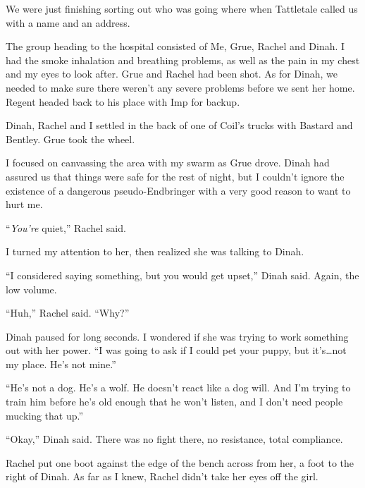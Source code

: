\blacksquare



We were just finishing sorting out who was going where when Tattletale called us with a name and an address.



The group heading to the hospital consisted of Me, Grue, Rachel and Dinah.  I had the smoke inhalation and breathing problems, as well as the pain in my chest and my eyes to look after.  Grue and Rachel had been shot.  As for Dinah, we needed to make sure there weren't any severe problems before we sent her home.  Regent headed back to his place with Imp for backup.



Dinah, Rachel and I settled in the back of one of Coil's trucks with Bastard and Bentley.  Grue took the wheel.



I focused on canvassing the area with my swarm as Grue drove.  Dinah had assured us that things were safe for the rest of night, but I couldn't ignore the existence of a dangerous pseudo-Endbringer with a very good reason to want to hurt me.



``\emph{You're} quiet,'' Rachel said.



I turned my attention to her, then realized she was talking to Dinah.



``I considered saying something, but you would get upset,'' Dinah said.  Again, the low volume.



``Huh,'' Rachel said.  ``Why?''



Dinah paused for long seconds.  I wondered if she was trying to work something out with her power.  ``I was going to ask if I could pet your puppy, but it's\ldots not my place.  He's not mine.''



``He's not a dog.  He's a wolf.  He doesn't react like a dog will.  And I'm trying to train him before he's old enough that he won't listen, and I don't need people mucking that up.''



``Okay,'' Dinah said.  There was no fight there, no resistance, total compliance.



Rachel put one boot against the edge of the bench across from her, a foot to the right of Dinah.  As far as I knew, Rachel didn't take her eyes off the girl.



